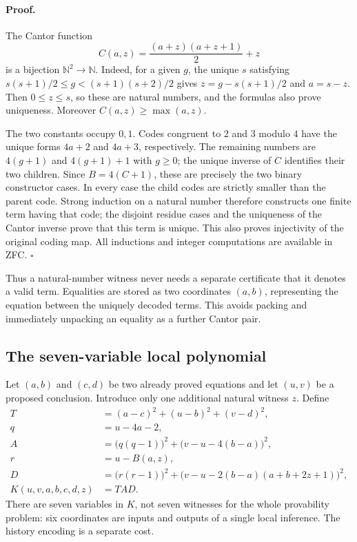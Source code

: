 \paragraph{Proof.}
The Cantor function
\[
 C(a,z)=\frac{(a+z)(a+z+1)}2+z
\]
is a bijection $\mathbb N^2\longrightarrow\mathbb N$.  Indeed, for a given
$g$, the unique $s$ satisfying
$s(s+1)/2\leq g<(s+1)(s+2)/2$ gives
$z=g-s(s+1)/2$ and $a=s-z$.  Then $0\leq z\leq s$, so these are natural
numbers, and the formulas also prove uniqueness.  Moreover
$C(a,z)\geq\max(a,z)$.

The two constants occupy $0,1$.  Codes congruent to $2$ and $3$ modulo $4$
have the unique forms $4a+2$ and $4a+3$, respectively.  The remaining
numbers are $4(g+1)$ and $4(g+1)+1$ with $g\geq0$; the unique inverse of
$C$ identifies their two children.  Since $B=4(C+1)$, these are precisely
the two binary constructor cases.  In every case the child codes are
strictly smaller than the parent code.  Strong induction on a natural
number therefore constructs one finite term having that code; the
disjoint residue cases and the uniqueness of the Cantor inverse prove
that this term is unique.  This also proves injectivity of the original
coding map.  All inductions and integer computations are available in
ZFC. \hfill$\square$

Thus a natural-number witness never needs a separate certificate that
it denotes a valid term.  Equalities are stored as two coordinates
$(a,b)$, representing the equation between the uniquely decoded terms.
This avoids packing and immediately unpacking an equality as a further
Cantor pair.

\subsection{The seven-variable local polynomial}

Let $(a,b)$ and $(c,d)$ be two already proved equations and let $(u,v)$
be a proposed conclusion.  Introduce only one additional natural witness
$z$.  Define
\begin{align*}
 T&=(a-c)^2+(u-b)^2+(v-d)^2,\\
 q&=u-4a-2,\\
 A&=\bigl(q(q-1)\bigr)^2+\bigl(v-u-4(b-a)\bigr)^2,\\
 r&=u-B(a,z),\\
 D&=\bigl(r(r-1)\bigr)^2
       +\bigl(v-u-2(b-a)(a+b+2z+1)\bigr)^2,\\
 K(u,v,a,b,c,d,z)&=TAD.
\end{align*}
There are seven variables in $K$, not seven witnesses for the whole
provability problem: six coordinates are inputs and outputs of a single
local inference.  The history encoding is a separate cost.

